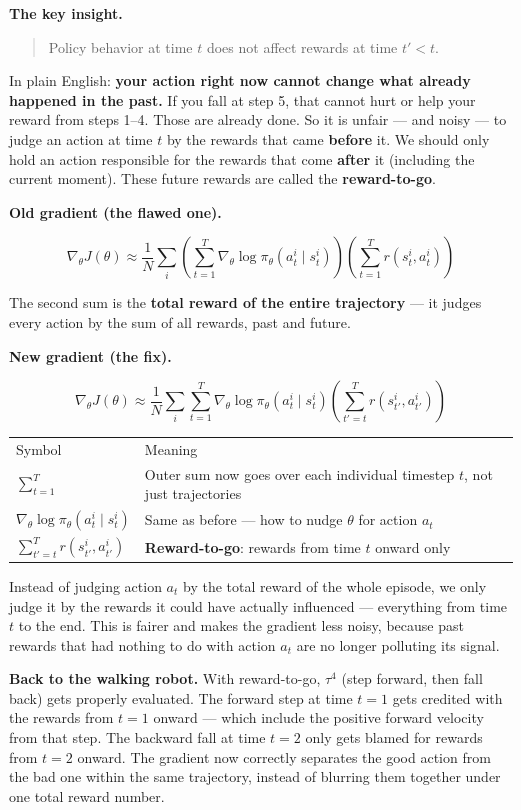 \textbf{The key insight.}

\begin{quote}
  Policy behavior at time $t$ does not affect rewards at time $t' < t$.
\end{quote}

In plain English: \textbf{your action right now cannot change what already happened in the
past.} If you fall at step 5, that cannot hurt or help your reward from steps 1--4. Those
are already done. So it is unfair --- and noisy --- to judge an action at time $t$ by the
rewards that came \textbf{before} it. We should only hold an action responsible for the
rewards that come \textbf{after} it (including the current moment). These future rewards are
called the \textbf{reward-to-go}.

\medskip
\textbf{Old gradient (the flawed one).}

\[
  \nabla_\theta J(\theta)
  \approx \frac{1}{N}\sum_i
    \left(\sum_{t=1}^T\nabla_\theta\log\pi_\theta(a_t^i\mid s_t^i)\right)
    \left(\sum_{t=1}^T r(s_t^i,a_t^i)\right)
\]

The second sum is the \textbf{total reward of the entire trajectory} --- it judges every
action by the sum of all rewards, past and future.

\medskip
\textbf{New gradient (the fix).}

\[
  \nabla_\theta J(\theta)
  \approx \frac{1}{N}\sum_i\sum_{t=1}^T
    \nabla_\theta\log\pi_\theta(a_t^i\mid s_t^i)
    \left(\sum_{t'=t}^{T} r(s_{t'}^i,a_{t'}^i)\right)
\]

\begin{tabular}{ll}
  Symbol & Meaning \\[4pt]
  $\sum_{t=1}^T$ & Outer sum now goes over each individual timestep $t$, not just trajectories \\
  $\nabla_\theta\log\pi_\theta(a_t^i\mid s_t^i)$ & Same as before --- how to nudge $\theta$ for action $a_t$ \\
  $\sum_{t'=t}^{T} r(s_{t'}^i,a_{t'}^i)$ & \textbf{Reward-to-go}: rewards from time $t$ onward only \\
\end{tabular}

\medskip
Instead of judging action $a_t$ by the total reward of the whole episode, we only judge it by
the rewards it could have actually influenced --- everything from time $t$ to the end. This is
fairer and makes the gradient less noisy, because past rewards that had nothing to do with
action $a_t$ are no longer polluting its signal.

\medskip
\textbf{Back to the walking robot.} With reward-to-go, $\tau^4$ (step forward, then fall back)
gets properly evaluated. The forward step at time $t=1$ gets credited with the rewards from
$t=1$ onward --- which include the positive forward velocity from that step. The backward fall
at time $t=2$ only gets blamed for rewards from $t=2$ onward. The gradient now correctly
separates the good action from the bad one within the same trajectory, instead of blurring
them together under one total reward number.